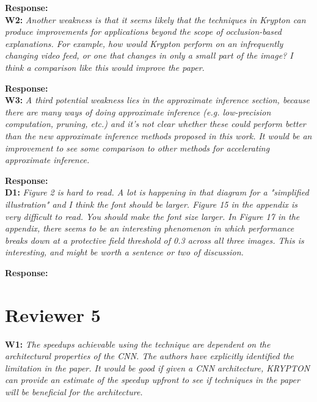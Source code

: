 \documentclass[preprint]{vldb}
\begin{document}
\vspace{2mm}
\noindent \textbf{Response:}\\


\vspace{2mm}
\noindent \textbf{W2:} \textit{Another weakness is that it seems likely that the techniques in Krypton can produce improvements for applications beyond the scope of occlusion-based explanations. For example, how would Krypton perform on an infrequently changing video feed, or one that changes in only a small part of the image? I think a comparison like this would improve the paper.}

\vspace{2mm}
\noindent \textbf{Response:}\\

\vspace{2mm}
\noindent \textbf{W3:} \textit{A third potential weakness lies in the approximate inference section, because there are many ways of doing approximate inference (e.g. low-precision computation, pruning, etc.) and it's not clear whether these could perform better than the new approximate inference methods proposed in this work. It would be an improvement to see some comparison to other methods for accelerating approximate inference.}

\vspace{2mm}
\noindent \textbf{Response:}\\

\vspace{2mm}
\noindent \textbf{D1:} \textit{Figure 2 is hard to read. A lot is happening in that diagram for a "simplified illustration" and I think the font should be larger. Figure 15 in the appendix is very difficult to read. You should make the font size larger. In Figure 17 in the appendix, there seems to be an interesting phenomenon in which performance breaks down at a protective field threshold of 0.3 across all three images. This is interesting, and might be worth a sentence or two of discussion.}


\vspace{2mm}
\noindent \textbf{Response:}\\


\section{Reviewer 5}

\vspace{2mm}
\noindent \textbf{W1:} \textit{ The speedups achievable using the technique are dependent on the architectural properties of the CNN. The authors have explicitly identified the limitation in the paper. It would be good if given a CNN architecture, KRYPTON can provide an estimate of the speedup upfront to see if techniques in the paper will be beneficial for the architecture.}
\end{document}
